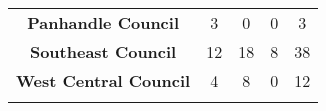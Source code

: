 \documentclass[]{article}
\begin{document}
\begin{longtable}[]{@{}ccccc@{}}
\begin{minipage}[t]{0.29\columnwidth}\centering\strut
\textbf{Panhandle Council}\strut
\end{minipage} & \begin{minipage}[t]{0.16\columnwidth}\centering\strut
3\strut
\end{minipage} & \begin{minipage}[t]{0.17\columnwidth}\centering\strut
0\strut
\end{minipage} & \begin{minipage}[t]{0.17\columnwidth}\centering\strut
0\strut
\end{minipage} & \begin{minipage}[t]{0.05\columnwidth}\centering\strut
3\strut
\end{minipage}\tabularnewline
\begin{minipage}[t]{0.29\columnwidth}\centering\strut
\textbf{Southeast Council}\strut
\end{minipage} & \begin{minipage}[t]{0.16\columnwidth}\centering\strut
12\strut
\end{minipage} & \begin{minipage}[t]{0.17\columnwidth}\centering\strut
18\strut
\end{minipage} & \begin{minipage}[t]{0.17\columnwidth}\centering\strut
8\strut
\end{minipage} & \begin{minipage}[t]{0.05\columnwidth}\centering\strut
38\strut
\end{minipage}\tabularnewline
\begin{minipage}[t]{0.29\columnwidth}\centering\strut
\textbf{West Central Council}\strut
\end{minipage} & \begin{minipage}[t]{0.16\columnwidth}\centering\strut
4\strut
\end{minipage} & \begin{minipage}[t]{0.17\columnwidth}\centering\strut
8\strut
\end{minipage} & \begin{minipage}[t]{0.17\columnwidth}\centering\strut
0\strut
\end{minipage} & \begin{minipage}[t]{0.05\columnwidth}\centering\strut
12\strut
\end{minipage}\tabularnewline
\begin{minipage}[t]{0.29\columnwidth}\centering\strut

\end{minipage}
\end{longtable}
\end{document}
